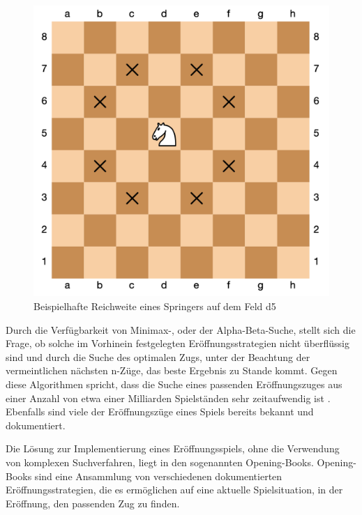\begin{figure}[h]
\centering
\includegraphics[width=\textwidth/2]{images/opening-books-strong-center-example.png}

\caption{Beispielhafte Reichweite eines Springers auf dem Feld d5}\label{fig:knight_reach}
\end{figure}

Durch die Verfügbarkeit von Minimax-, oder der Alpha-Beta-Suche, stellt sich die Frage, ob solche im Vorhinein festgelegten Eröffnungsstrategien nicht überflüssig sind und durch die Suche des optimalen Zugs, unter der Beachtung der vermeintlichen nächsten n-Züge, das beste Ergebnis zu Stande kommt. Gegen diese Algorithmen spricht, dass die Suche eines passenden Eröffnungszuges aus einer Anzahl von etwa einer Milliarden Spielständen sehr zeitaufwendig ist \cite{Russell2010}. Ebenfalls sind viele der Eröffnungszüge eines Spiels bereits bekannt und dokumentiert.


Die Lösung zur Implementierung eines Eröffnungsspiels, ohne die Verwendung von komplexen Suchverfahren, liegt in den sogenannten Opening-Books. Opening-Books sind eine Ansammlung von verschiedenen dokumentierten Eröffnungsstrategien, die es ermöglichen auf eine aktuelle Spielsituation, in der Eröffnung, den passenden Zug zu finden.

